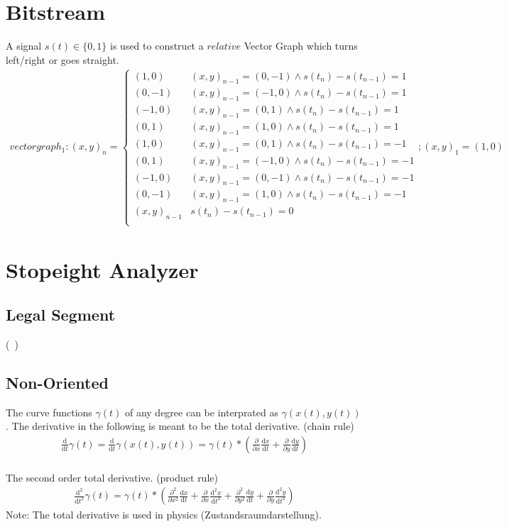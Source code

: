\documentclass{report}
\begin{document}
\section{Bitstream}
A signal $s(t)\in\{0,1\}$ is used to construct a $relative$ Vector Graph which turns left/right or goes straight.
\begin{align}
vectorgraph_{1}: (x,y)_{n}=
\begin{cases}
(1,0) & (x,y)_{n-1}= (0,-1)\land s(t_{n})-s(t_{n-1})=1\\
(0,-1) & (x,y)_{n-1}= (-1,0)\land s(t_{n})-s(t_{n-1})=1\\
(-1,0) & (x,y)_{n-1}= (0,1)\land s(t_{n})-s(t_{n-1})=1\\
(0,1) & (x,y)_{n-1}= (1,0)\land s(t_{n})-s(t_{n-1})=1\\
(1,0) & (x,y)_{n-1}= (0,1)\land s(t_{n})-s(t_{n-1})=-1\\
(0,1) & (x,y)_{n-1}= (-1,0)\land s(t_{n})-s(t_{n-1})=-1\\
(-1,0) & (x,y)_{n-1}= (0,-1)\land s(t_{n})-s(t_{n-1})=-1\\
(0,-1) & (x,y)_{n-1}= (1,0)\land s(t_{n})-s(t_{n-1})=-1\\
(x,y)_{n-1} & s(t_{n})-s(t_{n-1})=0\\
\end{cases};(x,y)_{1}=(1,0)
\end{align}

\section{Stopeight Analyzer}

\subsection{Legal Segment}
(~\cite[Riemann Integrable?]{Widon})

\subsection{Non-Oriented}
The curve functions $ \gamma (t)$ of any degree can be interprated as $\gamma(x(t),y(t))$. The derivative in the following is meant to be the total derivative. (chain rule)
\begin{align}
\frac{\mathrm{d}}{\mathrm{d} t} \gamma (t) = \frac{\mathrm{d}}{\mathrm{d} t} \gamma (x(t),y(t)) = \gamma(t)* (\frac{\partial}{\partial x}  \frac{\mathrm{d} x}{\mathrm{d}t} + \frac{\partial}{\partial y} \frac{\mathrm{d} y}{\mathrm{d}t})
\end{align}\\
The second order total derivative. (product rule)
\begin{align}
\frac{\mathrm{d}^2}{\mathrm{d}t^2}\gamma(t)= \gamma(t)* (\frac{\partial^2}{\partial x^2}\frac{\mathrm{d}x}{\mathrm{d}t} + \frac{\partial}{\partial x}\frac{\mathrm{d}^2x}{\mathrm{d}t^2} + \frac{\partial^2}{\partial y^2}\frac{\mathrm{d}y}{\mathrm{d}t} + \frac{\partial}{\partial y}\frac{\mathrm{d}^2y}{\mathrm{d}t^2})
\end{align}
Note: The total derivative is used in physics (Zustandsraumdarstellung).
\end{document}
